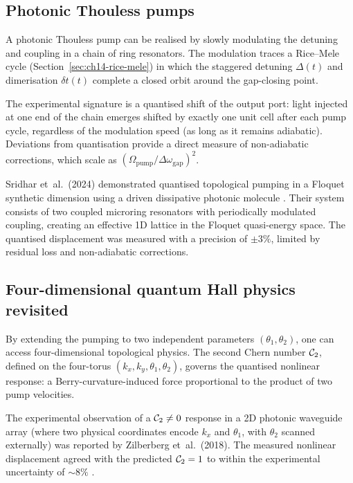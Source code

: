 \subsection{Photonic Thouless pumps}
\label{sec:ch16-photonic-pump}

A photonic Thouless pump can be realised by slowly modulating the
detuning and coupling in a chain of ring resonators.  The modulation
traces a Rice--Mele cycle (Section~\ref{sec:ch14-rice-mele}) in
which the staggered detuning $\Delta(t)$ and dimerisation
$\delta t(t)$ complete a closed orbit around the gap-closing point.

The experimental signature is a quantised shift of the output port:
light injected at one end of the chain emerges shifted by exactly one
unit cell after each pump cycle, regardless of the modulation speed
(as long as it remains adiabatic).  Deviations from quantisation
provide a direct measure of non-adiabatic corrections, which scale
as $(\Omega_{\mathrm{pump}}/\Delta\omega_{\mathrm{gap}})^2$.

Sridhar et~al.\ (2024) demonstrated quantised topological pumping in
a Floquet synthetic dimension using a driven dissipative photonic
molecule \cite{sridhar2024quantized}.  Their system consists of two
coupled microring resonators with periodically modulated coupling,
creating an effective 1D lattice in the Floquet quasi-energy space.
The quantised displacement was measured with a precision of $\pm 3\%$,
limited by residual loss and non-adiabatic corrections.

\subsection{Four-dimensional quantum Hall physics revisited}
\label{sec:ch16-4d-pump}

By extending the pumping to two independent parameters
$(\theta_1,\theta_2)$, one can access four-dimensional topological
physics.  The second Chern number $\mathcal{C}_2$, defined on the
four-torus $(k_x,k_y,\theta_1,\theta_2)$, governs the quantised
nonlinear response: a Berry-curvature-induced force proportional
to the product of two pump velocities.

The experimental observation of a $\mathcal{C}_2\neq 0$ response in a
2D photonic waveguide array (where two physical coordinates encode
$k_x$ and $\theta_1$, with $\theta_2$ scanned externally) was
reported by Zilberberg et~al.\ (2018).  The measured nonlinear
displacement agreed with the predicted $\mathcal{C}_2=1$ to within the
experimental uncertainty of $\sim 8\%$
\cite{ozawa2018topological,price2022roadmap}.

